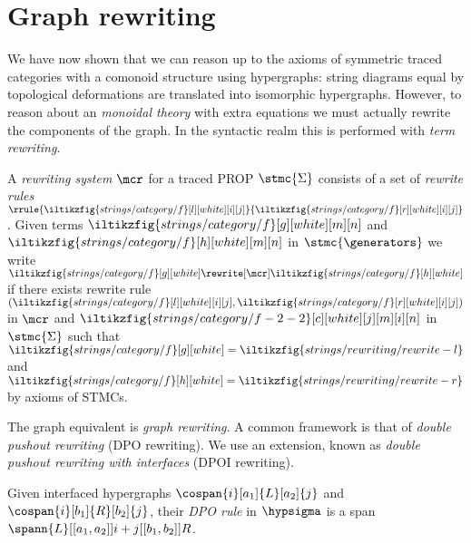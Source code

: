 \section{Graph rewriting}

We have now shown that we can reason up to the axioms of symmetric traced
categories with a comonoid structure using hypergraphs: string diagrams equal by
topological deformations are translated into isomorphic hypergraphs.
However, to reason about an \emph{monoidal theory} with extra equations we must
actually rewrite the components of the graph.
In the syntactic realm this is performed with \emph{term rewriting}.

\begin{definition}\label{def:term-rewriting}
    A \emph{rewriting system} \(\mcr\) for a traced PROP \(\stmc{\Sigma}\)
    consists of a set of \emph{rewrite rules} \(
        \rrule{
            \iltikzfig{strings/category/f}[l][white][i][j]
        }{
            \iltikzfig{strings/category/f}[r][white][i][j]
        }
    \).
    Given terms \(
        \iltikzfig{strings/category/f}[g][white][m][n]
    \) and \(
        \iltikzfig{strings/category/f}[h][white][m][n]
    \) in \(\stmc{\generators}\) we write \(
        \iltikzfig{strings/category/f}[g][white]
        \rewrite[\mcr]
        \iltikzfig{strings/category/f}[h][white]
    \) if there exists rewrite rule \((
        \iltikzfig{strings/category/f}[l][white][i][j],
        \iltikzfig{strings/category/f}[r][white][i][j]
    )\) in \(\mcr\) and \(
        \iltikzfig{strings/category/f-2-2}[c][white][j][m][i][n]
    \) in \(\stmc{\Sigma}\) such that \(
        \iltikzfig{strings/category/f}[g][white]
        =
        \iltikzfig{strings/rewriting/rewrite-l}
    \) and \(
        \iltikzfig{strings/category/f}[h][white]
        =
        \iltikzfig{strings/rewriting/rewrite-r}
    \) by axioms of STMCs.
\end{definition}

The graph equivalent is \emph{graph rewriting}.
A common framework is that of \emph{double pushout rewriting} (DPO rewriting).
We use an extension, known as \emph{double pushout rewriting with interfaces}
(DPOI rewriting).

\begin{definition}
    Given interfaced hypergraphs \(
        \cospan{i}[a_1]{L}[a_2]{j}
    \) and \(
        \cospan{i}[b_1]{R}[b_2]{j}
    \), their \emph{DPO rule} in \(\hypsigma\) is a span \(
        \spann{L}[[a_1,a_2]]{i+j}[[b_1,b_2]]{R}
    \).
\end{definition}

